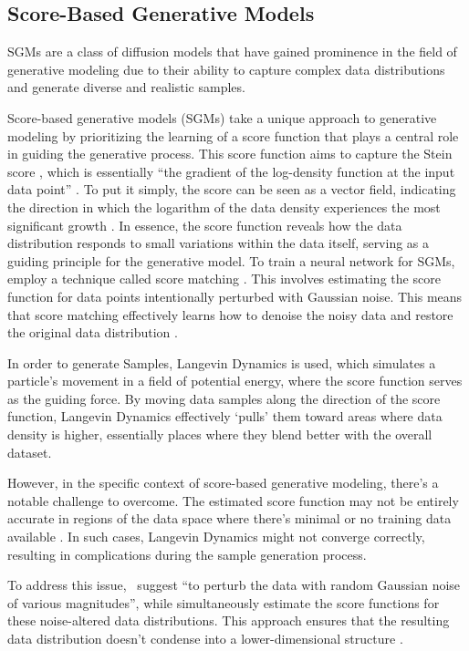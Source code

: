\subsection{Score-Based Generative Models}
SGMs are a class of diffusion models that have gained prominence in the field of generative modeling due to their ability to capture complex data distributions and generate diverse and realistic samples.

Score-based generative models (SGMs) take a unique approach to generative modeling by prioritizing the learning of a score function that plays a central role in guiding the generative process. This score function aims to capture the Stein score \citep{steinScore}, which is essentially ``the gradient of the log-density function at the input data point'' \citep{song2019SGM}. To put it simply, the score can be seen as a vector field, indicating the direction in which the logarithm of the data density experiences the most significant growth \citep{song2019SGM}. In essence, the score function reveals how the data distribution responds to small variations within the data itself, serving as a guiding principle for the generative model. To train a neural network for SGMs,~\cite{song2019SGM} employ a technique called score matching \citep{hyvarinenScoreMatching}. This involves estimating the score function for data points intentionally perturbed with Gaussian noise. This means that score matching effectively learns how to denoise the noisy data and restore the original data distribution \citep{song2020improved}.

In order to generate Samples, Langevin Dynamics \citep{robertsLangevin} is used, which simulates a particle's movement in a field of potential energy, where the score function serves as the guiding force. By moving data samples along the direction of the score function, Langevin Dynamics effectively `pulls' them toward areas where data density is higher, essentially places where they blend better with the overall dataset.

However, in the specific context of score-based generative modeling, there's a notable challenge to overcome. The estimated score function may not be entirely accurate in regions of the data space where there's minimal or no training data available \citep{song2019SGM}. In such cases, Langevin Dynamics might not converge correctly, resulting in complications during the sample generation process. 

To address this issue,~\cite{song2019SGM} suggest ``to perturb the data with random Gaussian noise of various magnitudes'', while simultaneously estimate the score functions for these noise-altered data distributions. This approach ensures that the resulting data distribution doesn't condense into a lower-dimensional structure \citep{song2019SGM}.







